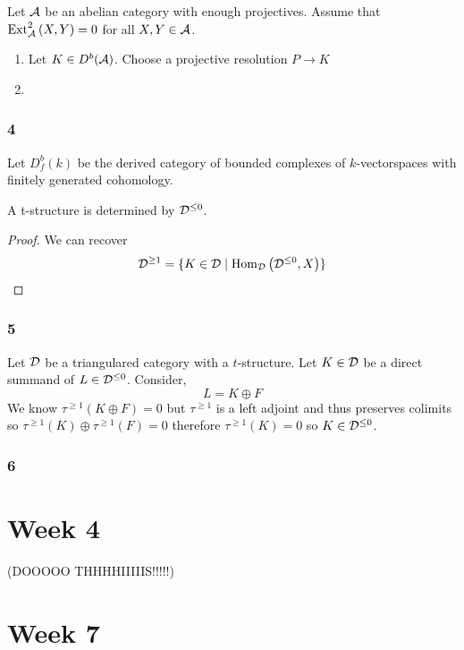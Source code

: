 \documentclass[12pt]{article}
\begin{document}
Let $\mathcal{A}$ be an abelian category with enough projectives. Assume that $\mathrm{Ext}^{2}_{\mathcal{A}} \left( X, Y \right) = 0$ for all $X, Y \in \mathcal{A}$.

\begin{enumerate}
\item Let $K \in D^b(\mathcal{A})$. Choose a projective resolution $P \to K$ 

\item 
\end{enumerate}

\subsubsection*{4}

Let $D^b_f(k)$ be the derived category of bounded complexes of $k$-vectorspaces with finitely generated cohomology.

\begin{lemma}
A t-structure is determined by $\mathcal{D}^{\le 0}$.
\end{lemma}

\begin{proof}
We can recover 
\[ \mathcal{D}^{\ge 1} = \{K \in \mathcal{D} \mid \mathrm{Hom}_{\mathcal{D}} \left( \mathcal{D}^{\le 0}, X \right) \} \]
\end{proof}

\subsubsection*{5}

Let $\mathcal{D}$ be a triangulared category with a $t$-structure. Let $K \in \mathcal{D}$ be a direct summand of $L \in \mathcal{D}^{\le 0}$. Consider,
\[ L = K \oplus F \]
We know $\tau^{\ge 1} (K \oplus F) = 0$ but $\tau^{\ge 1}$ is a left adjoint and thus preserves colimits so $\tau^{\ge 1} (K) \oplus \tau^{\ge 1}(F) = 0$ therefore $\tau^{\ge 1}(K) = 0$ so $K \in \mathcal{D}^{\le 0}$. 

\subsubsection*{6}


\section{Week 4}

(DOOOOO THHHHIIIIIS!!!!!)

\section{Week 7}
\end{document}
